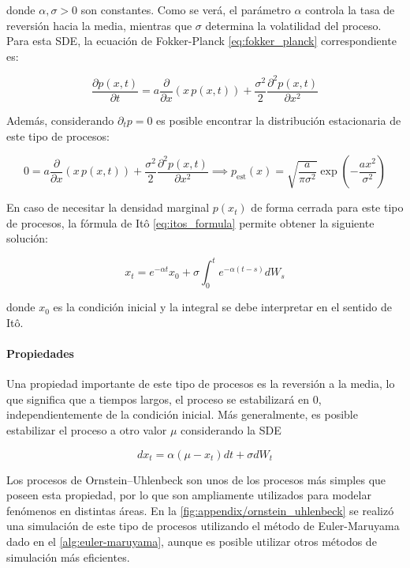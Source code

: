donde $\alpha, \sigma > 0$ son constantes. Como se verá, el parámetro $\alpha$ controla la tasa de reversión hacia la media, mientras que $\sigma$ determina la volatilidad del proceso. Para esta SDE, la ecuación de Fokker-Planck \eqref{eq:fokker_planck} correspondiente es:

\begin{equation*}
    \frac{\partial p(x,t)}{\partial t} = a\frac{\partial}{\partial x} (x\, p(x, t)) + \frac{\sigma^2}{2} \frac{\partial^{2}p(x, t)}{\partial x^2}
\end{equation*}

Además, considerando $\partial_{t}p=0$ es posible encontrar la distribución estacionaria de este tipo de procesos:

\begin{equation*}
    0 = a\frac{\partial}{\partial x} (x\, p(x, t)) + \frac{\sigma^2}{2} \frac{\partial^{2}p(x, t)}{\partial x^2}
    \implies
    p_{\operatorname{est}}(x) = \sqrt{\frac{a}{\pi\sigma^{2}}}\exp\left(-\frac{ax^2}{\sigma^2}\right)
\end{equation*}

En caso de necesitar la densidad marginal $p(x_t)$ de forma cerrada para este tipo de procesos, la fórmula de Itô \eqref{eq:itos_formula} permite obtener la siguiente solución:

\begin{equation*}
    x_t = e^{-\alpha t} x_0 + \sigma \int_0^t e^{-\alpha(t-s)} dW_s
\end{equation*}

donde $x_0$ es la condición inicial y la integral se debe interpretar en el sentido de Itô.

\paragraph{Propiedades}

Una propiedad importante de este tipo de procesos es la reversión a la media, lo que significa que a tiempos largos, el proceso se estabilizará en 0, independientemente de la condición inicial. Más generalmente, es posible estabilizar el proceso a otro valor $\mu$ considerando la SDE

\begin{equation*}
    dx_t = \alpha(\mu-x_t) dt + \sigma dW_t
\end{equation*}

Los procesos de Ornstein–Uhlenbeck son unos de los procesos más simples que poseen esta propiedad, por lo que son ampliamente utilizados para modelar fenómenos en distintas áreas. En la \autoref{fig:appendix/ornstein_uhlenbeck} se realizó una simulación de este tipo de procesos utilizando el método de Euler-Maruyama dado en el \autoref{alg:euler-maruyama}, aunque es posible utilizar otros métodos de simulación más eficientes.

